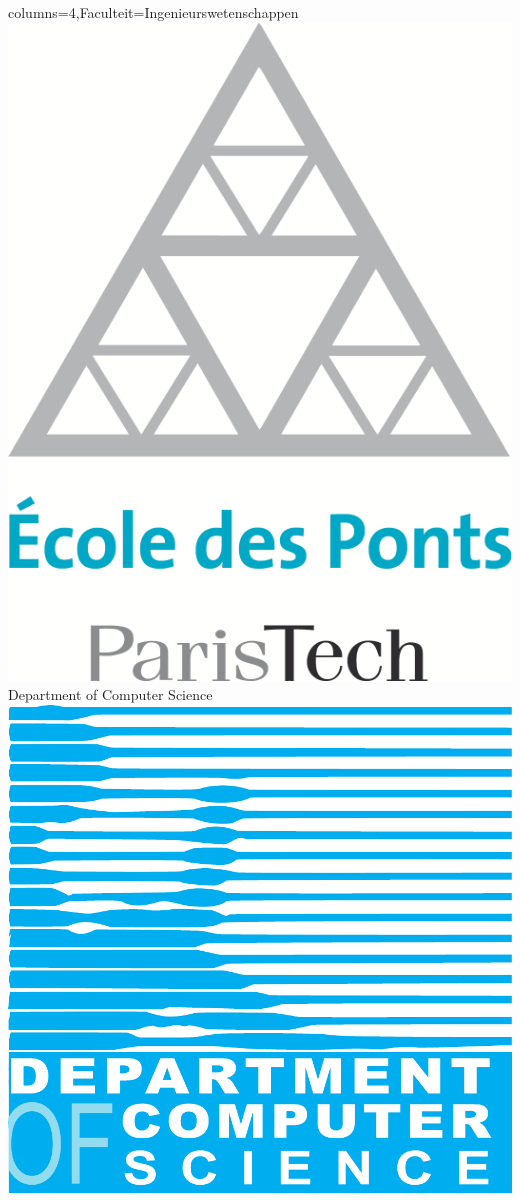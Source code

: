 \documentclass[landscape,a0paper,fontscale=0.45]{kuleuvenposter}
\begin{document}
\begin{poster}{columns=4,Faculteit=Ingenieurswetenschappen}
{  \includegraphics[height=.8\footerheight]{specific/logo_EcolePonts} %
}
{ %
  Department of Computer Science%
}
{ %
  \includegraphics[height=\footerheight]{images/logo_CS}%
}


\end{poster}
\end{document}
